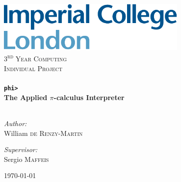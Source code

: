 \begin{titlepage}
    \begin{center}
        \includegraphics[width=0.70\textwidth]{./assets/imperial}~\\[1cm]
        \textsc{\LARGE 3\textsuperscript{rd} Year Computing} \\[0.5cm]
        \textsc{\LARGE Individual Project} \\[0.5cm]
        \HRule \\[0.4cm]
        {\huge \bfseries \verb!phi>!\\ The Applied $\pi$-calculus Interpreter\\[0.4cm]}
        \HRule \\[1.5cm]
            \begin{flushleft}
                \large
                \emph{Author:}\\
                William \textsc{de Renzy-Martin}\\
            \end{flushleft}
            \begin{flushright}
                \large
                \emph{Supervisor:}\\
                Sergio \textsc{Maffeis}
            \end{flushright}
        \vfill
        {\large \today}
    \end{center}
\end{titlepage}
